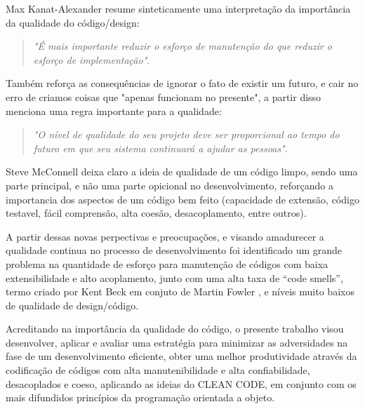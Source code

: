 \documentclass[12pt]{article}
\begin{document}
 Max Kanat-Alexander \cite{CODE_SIMPLICITY} resume sinteticamente uma interpretação da importância da qualidade do código/design: 

\begin{quote}
 \emph{"É mais importante reduzir o esforço de manutenção do que reduzir o esforço de implementação"}.
\end{quote} 


 Também reforça as consequências de ignorar o fato de existir um futuro, e cair no erro de criamos coisas que "apenas funcionam no presente", a partir disso menciona uma regra importante para a qualidade: 

\begin{quote}
 \emph{"O nível de qualidade do seu projeto deve ser proporcional ao tempo do futuro em que seu sistema continuará a ajudar as pessoas"}.
\end{quote} 


	Steve McConnell \cite{CODE_COMPLETE_2} deixa claro a ideia de qualidade de um código limpo, sendo uma parte principal, e não uma parte opicional no desenvolvimento, reforçando a importancia dos aspectos de um código bem feito (capacidade de extensão, código testavel, fácil comprensão, alta coesão, desacoplamento, entre outros).
	 

A partir dessas novas perpectivas e preocupações, e visando amadurecer a qualidade continua no processo de desenvolvimento foi identificado um grande problema na quantidade de esforço para manutenção de códigos com baixa extensibilidade e alto acoplamento, junto com uma alta taxa de “code smells”, termo criado por Kent Beck em conjuto de Martin Fowler \cite{MARTIN_FOWLER_REFACTORING}, e níveis muito baixos de qualidade de design/código.

Acreditando na importância da qualidade do código, o presente trabalho visou desenvolver, aplicar e avaliar uma estratégia para minimizar as adversidades na fase de um desenvolvimento eficiente, obter uma melhor produtividade através da codificação de códigos com alta manutenibilidade e alta confiabilidade, desacoplados e coeso, aplicando as ideias do CLEAN CODE, em conjunto com os mais difundidos princípios da programação orientada a objeto.
\end{document}
